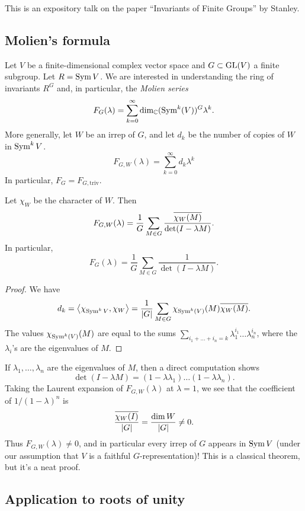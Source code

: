 \documentclass{amsart}
\begin{document}
This is an expository talk on the paper ``Invariants of Finite Groups'' by Stanley.

\subsection{Molien's formula}

Let $V$ be a finite-dimensional complex vector space and $G \subset \mathrm{GL}(V)$ a finite subgroup.
Let $R = \operatorname{Sym} V$.
We are interested in understanding the ring of invariants $R^G$ and, in particular, the \emph{Molien series}
\[
	F_G(\lambda) = \sum_{k=0}^\infty \dim_{\mathbb{C}} (\operatorname{Sym}^k(V))^G \lambda^k.
\]
More generally, let $W$ be an irrep of $G$, and let $d_k$ be the number of copies of $W$ in $\operatorname{Sym}^k V$.
\[
	F_{G,W}(\lambda) = \sum_{k=0}^\infty d_k \lambda^k
\]
In particular, $F_G = F_{G,\mathrm{triv}}$.

\begin{thm}
	Let $\chi_W$ be the character of $W$.
	Then
	\[
		F_{G,W}(\lambda) = \frac{1}{G} \sum_{M \in G} \frac{\overline{\chi_W(M)}}{\det(I - \lambda M)}.
	\]
	In particular,
	\[
		F_G(\lambda) = \frac{1}{G} \sum_{M \in G} \frac{1}{\det(I - \lambda M)}.
	\]
\end{thm}

\begin{proof}
	We have 
	\[
		d_k = \left\langle {\chi_{\operatorname{Sym}^k V}}, {\chi_W} \right\rangle = \frac{1}{\left|{G}\right|} \sum_{M \in G} \chi_{\operatorname{Sym}^k(V)}(M) \overline{\chi_W(M)}.
	\]
	The values $\chi_{\operatorname{Sym}^k(V)}(M)$ are equal to the sums $\sum_{i_1 + \dots + i_n = k} \lambda_1^{i_1} \dots \lambda_n^{i_n}$, where the $\lambda_i$'s are the eigenvalues of $M$.
\end{proof}

If $\lambda_1, \dots, \lambda_n$ are the eigenvalues of $M$, then a direct computation shows
\[
	\det(I - \lambda M) = (1 - \lambda \lambda_1) \dots (1 - \lambda \lambda_n).
\]
Taking the Laurent expansion of $F_{G,W}(\lambda)$ at $\lambda = 1$, we see that the coefficient of $1 / (1 - \lambda)^n$ is 
\[
	\frac{\overline{\chi_W(I)}}{|G|} = \frac{\dim W}{|G|} \neq 0.
\]
Thus $F_{G,W}(\lambda) \neq 0$, and in particular every irrep of $G$ appears in $\operatorname{Sym} V$ (under our assumption that $V$ is a faithful $G$-representation)!
This is a classical theorem, but it's a neat proof.

\subsection{Application to roots of unity}
\end{document}
